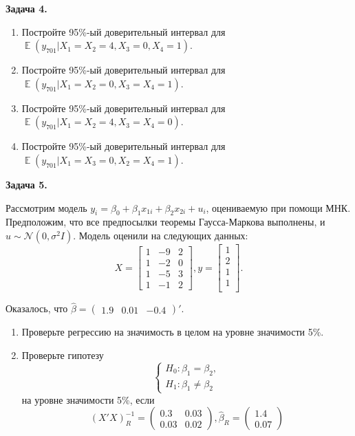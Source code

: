\documentclass[10pt, a4paper]{extarticle}
\DeclareMathOperator{\E}{\mathbb{E}}
\begin{document}
	{\Large \textbf{Задача 4.}}
	\begin{enumerate}[label=\alph*)]
		\item Постройте 95\%-ый доверительный интервал для $\E(y_{701} | X_1 = X_2 = 4, X_3 = 0, X_4 = 1)$.
		\item Постройте 95\%-ый доверительный интервал для $\E(y_{701} | X_1 = X_2 = 0, X_3 = X_4 = 1)$.
		\item Постройте 95\%-ый доверительный интервал для $\E(y_{701} | X_1 = X_2 = 4, X_3 = X_4 = 0)$.
		\item Постройте 95\%-ый доверительный интервал для $\E(y_{701} | X_1 = X_3 = 0, X_2 = X_4 = 1)$.
	\end{enumerate}
	\vspace{1em}

	{\Large \textbf{Задача 5.}}
	
	Рассмотрим модель $y_i = \beta_0 + \beta_1x_{1i} + \beta_2x_{2i} + u_i$, оцениваемую при помощи МНК. Предположим, что все предпосылки теоремы Гаусса-Маркова выполнены, и $u \sim \mathcal{N}(0, \sigma^2I)$. Модель оценили на следующих данных:
	\[
	X = \begin{bmatrix}
		1 & -9 & 2 \\
		1 & -2 & 0 \\
		1 & -5 & 3 \\
		1 & -1 & 2 
	\end{bmatrix},
	y = \begin{bmatrix}
		1 \\
		2 \\
		1 \\
		1 \\
	\end{bmatrix}.
	\]
	
	Оказалось, что $\hat{\beta} = \begin{pmatrix}
		1.9 & 0.01 & -0.4
	\end{pmatrix}'$.

	\begin{enumerate}[label=\alph*)]
		\item Проверьте регрессию на значимость в целом на уровне значимости 5\%.
		\item Проверьте гипотезу
		\[
		\begin{cases}
			H_0: \beta_1 = \beta_2, \\
			H_1: \beta_1 \ne \beta_2
		\end{cases}
		\]
		на уровне значимости 5\%, если 
		\[
		(X'X)^{-1}_R = \begin{pmatrix}
			0.3 & 0.03 \\
			0.03 &  0.02
		\end{pmatrix}, \hat{\beta}_R = \begin{pmatrix}
		1.4 \\
		0.07
	\end{pmatrix}
		\]
	\end{enumerate}
	\vspace{1em}
	
\end{document}
